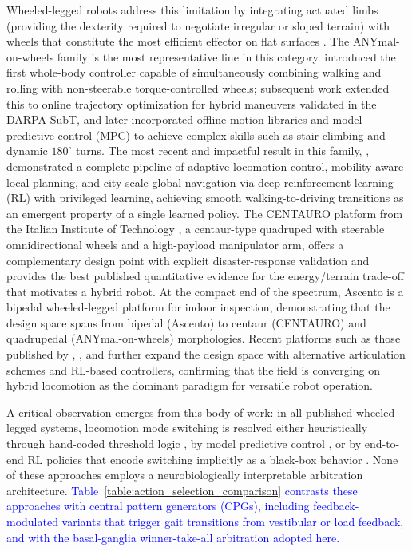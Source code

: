 \documentclass[preprint,12pt]{elsarticle}
\newcommand{\revblue}[1]{\textcolor{blue}{#1}}
\begin{document}
Wheeled-legged robots address this limitation by integrating actuated limbs (providing the dexterity required to negotiate irregular or sloped terrain) with wheels that constitute the most efficient effector on flat surfaces \citep{Bjelonic2023Survey}. The ANYmal-on-wheels family is the most representative line in this category. \citet{Bjelonic2019KeepRollin} introduced the first whole-body controller capable of simultaneously combining walking and rolling with non-steerable torque-controlled wheels; subsequent work \citep{bjelonic2019} extended this to online trajectory optimization for hybrid maneuvers validated in the DARPA SubT, and \citet{Bjelonic2022OfflineMotion} later incorporated offline motion libraries and model predictive control (MPC) to achieve complex skills such as stair climbing and dynamic $180^{\circ}$ turns. The most recent and impactful result in this family, \citet{Lee2024Science}, demonstrated a complete pipeline of adaptive locomotion control, mobility-aware local planning, and city-scale global navigation via deep reinforcement learning (RL) with privileged learning, achieving smooth walking-to-driving transitions as an emergent property of a single learned policy. The CENTAURO platform from the Italian Institute of Technology \citep{Kashiri2019CENTAURO,Klamt2019CENTAURO}, a centaur-type quadruped with steerable omnidirectional wheels and a high-payload manipulator arm, offers a complementary design point with explicit disaster-response validation and provides the best published quantitative evidence for the energy/terrain trade-off that motivates a hybrid robot. At the compact end of the spectrum, Ascento \citep{Klemm2019Ascento} is a bipedal wheeled-legged platform for indoor inspection, demonstrating that the design space spans from bipedal (Ascento) to centaur (CENTAURO) and quadrupedal (ANYmal-on-wheels) morphologies. Recent platforms such as those published by \citet{Liu2024Max}, \citet{Cui2025FLORES}, and \citet{Jiang2025RTaichi} further expand the design space with alternative articulation schemes and RL-based controllers, confirming that the field is converging on hybrid locomotion as the dominant paradigm for versatile robot operation.

A critical observation emerges from this body of work: in all published wheeled-legged systems, locomotion mode switching is resolved either heuristically through hand-coded threshold logic \citep{Kashiri2019CENTAURO}, by model predictive control \citep{bjelonic2019,Bjelonic2022OfflineMotion}, or by end-to-end RL policies that encode switching implicitly as a black-box behavior \citep{Lee2024Science,Humphreys2025BioInspired}. None of these approaches employs a neurobiologically interpretable arbitration architecture. \revblue{Table~\ref{table:action_selection_comparison} contrasts these approaches with central pattern generators (CPGs), including feedback-modulated variants that trigger gait transitions from vestibular or load feedback, and with the basal-ganglia winner-take-all arbitration adopted here.}
\end{document}
